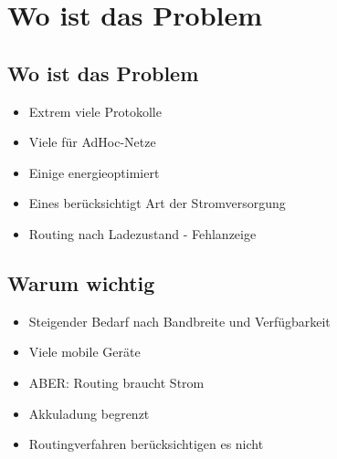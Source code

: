 \documentclass[11pt,handout,notes=only]{beamer}
\begin{document}

\section{Wo ist das Problem}

\subsection{Wo ist das Problem}

\begin{frame}{\insertsubsection}
\begin{itemize}
\item Extrem viele Protokolle\newline
\item Viele für AdHoc-Netze\newline
\item Einige energieoptimiert\newline
\item Eines berücksichtigt Art der Stromversorgung\newline
\item Routing nach Ladezustand - Fehlanzeige
\end{itemize}
\end{frame}


\subsection{Warum wichtig}

\begin{frame}{\insertsubsection}
\begin{itemize}
\item Steigender Bedarf nach Bandbreite und Verfügbarkeit\newline
\item Viele mobile Geräte\newline
\item ABER: Routing braucht Strom\newline
\item Akkuladung begrenzt\newline
\item Routingverfahren berücksichtigen es nicht
\end{itemize}
\end{frame}
\end{document}
